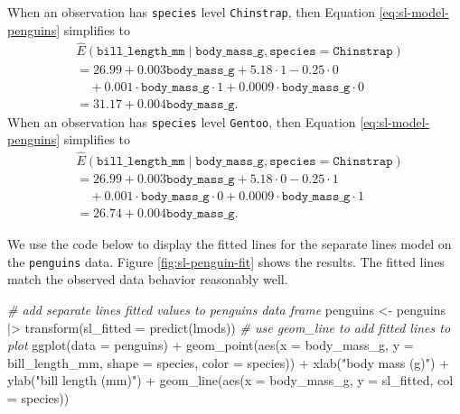 \documentclass[
]{book}
\newenvironment{Shaded}{\begin{snugshade}}{\end{snugshade}}
\newcommand{\AttributeTok}[1]{\textcolor[rgb]{0.77,0.63,0.00}{#1}}
\newcommand{\CommentTok}[1]{\textcolor[rgb]{0.56,0.35,0.01}{\textit{#1}}}
\newcommand{\FunctionTok}[1]{\textcolor[rgb]{0.00,0.00,0.00}{#1}}
\newcommand{\NormalTok}[1]{#1}
\newcommand{\OtherTok}[1]{\textcolor[rgb]{0.56,0.35,0.01}{#1}}
\newcommand{\SpecialCharTok}[1]{\textcolor[rgb]{0.00,0.00,0.00}{#1}}
\newcommand{\StringTok}[1]{\textcolor[rgb]{0.31,0.60,0.02}{#1}}
\theoremstyle{definition}
\theoremstyle{definition}
\theoremstyle{definition}
\theoremstyle{definition}
\theoremstyle{remark}
\begin{document}
When an observation has \texttt{species} level \texttt{Chinstrap}, then Equation \eqref{eq:sl-model-penguins} simplifies to
\[
\begin{aligned}
&\hat{E}(\mathtt{bill\_length\_mm} \mid \mathtt{body\_mass\_g}, \mathtt{species}=\mathtt{Chinstrap}) \\
&=26.99 + 0.003 \mathtt{body\_mass\_g} + 5.18 \cdot 1 - 0.25 \cdot 0 \\
&\quad + 0.001 \cdot \mathtt{body\_mass\_g} \cdot 1 + 0.0009 \cdot \mathtt{body\_mass\_g} \cdot 0 \\
&= 31.17 + 0.004 \mathtt{body\_mass\_g}.
\end{aligned}
\]
When an observation has \texttt{species} level \texttt{Gentoo}, then Equation \eqref{eq:sl-model-penguins} simplifies to
\[
\begin{aligned}
&\hat{E}(\mathtt{bill\_length\_mm} \mid \mathtt{body\_mass\_g}, \mathtt{species}=\mathtt{Chinstrap}) \\
&=26.99 + 0.003 \mathtt{body\_mass\_g} + 5.18 \cdot 0 - 0.25 \cdot 1 \\
&\quad + 0.001 \cdot \mathtt{body\_mass\_g} \cdot 0 + 0.0009 \cdot \mathtt{body\_mass\_g} \cdot 1 \\
&= 26.74 + 0.004 \mathtt{body\_mass\_g}.
\end{aligned}
\]

We use the code below to display the fitted lines for the separate lines model on the \texttt{penguins} data. Figure \ref{fig:sl-penguin-fit} shows the results. The fitted lines match the observed data behavior reasonably well.

\begin{Shaded}
\begin{Highlighting}[]
\CommentTok{\# add separate lines fitted values to penguins data frame}
\NormalTok{penguins }\OtherTok{\textless{}{-}}
\NormalTok{  penguins }\SpecialCharTok{|\textgreater{}}
  \FunctionTok{transform}\NormalTok{(}\AttributeTok{sl\_fitted =} \FunctionTok{predict}\NormalTok{(lmods))}
\CommentTok{\# use geom\_line to add fitted lines to plot}
\FunctionTok{ggplot}\NormalTok{(}\AttributeTok{data =}\NormalTok{ penguins) }\SpecialCharTok{+}
  \FunctionTok{geom\_point}\NormalTok{(}\FunctionTok{aes}\NormalTok{(}\AttributeTok{x =}\NormalTok{ body\_mass\_g, }\AttributeTok{y =}\NormalTok{ bill\_length\_mm, }\AttributeTok{shape =}\NormalTok{ species, }\AttributeTok{color =}\NormalTok{ species)) }\SpecialCharTok{+}
  \FunctionTok{xlab}\NormalTok{(}\StringTok{"body mass (g)"}\NormalTok{) }\SpecialCharTok{+} \FunctionTok{ylab}\NormalTok{(}\StringTok{"bill length (mm)"}\NormalTok{) }\SpecialCharTok{+}
  \FunctionTok{geom\_line}\NormalTok{(}\FunctionTok{aes}\NormalTok{(}\AttributeTok{x =}\NormalTok{ body\_mass\_g, }\AttributeTok{y =}\NormalTok{ sl\_fitted, }\AttributeTok{col =}\NormalTok{ species))}
\end{Highlighting}
\end{Shaded}
\end{document}
